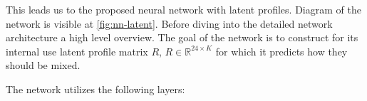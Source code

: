 This leads us to the proposed neural network with latent profiles. Diagram of the network is visible at \ref{fig:nn-latent}. Before diving into the detailed network architecture a high level overview. The goal of the network is to construct for its internal use latent profile matrix $R$, $R \in \mathbb{R}^{24 \times K}$ for which it predicts how they should be mixed.

\newpage

The network utilizes the following layers:

\newcommand{\nnmodule}[3]{%
    \begin{marginfigure}[1cm]
        \centering
        \texttt{[image: \#2]}
    \end{marginfigure}
    \item \textbf{#1} \\
    #3
    \vspace{2mm}
}


